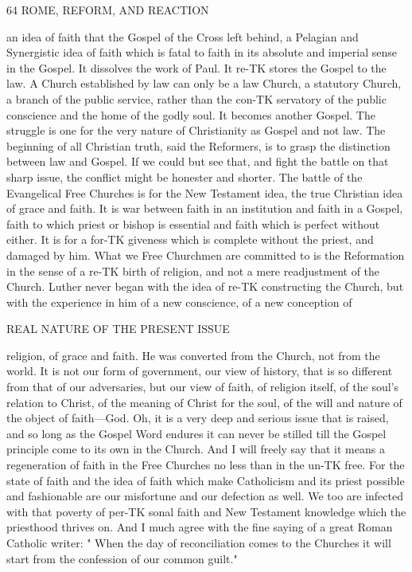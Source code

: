 \documentclass[12pt,a5paper,oneside]{book}
\begin{document}
64 ROME, REFORM, AND REACTION 

an idea of faith that the Gospel of the Cross left 
behind, a Pelagian and Synergistic idea of faith which 
is fatal to faith in its absolute and imperial sense in 
the Gospel. It dissolves the work of Paul. It re-TK
stores the Gospel to the law. A Church established 
by law can only be a law Church, a statutory Church, 
a branch of the public service, rather than the con-TK
servatory of the public conscience and the home of 
the godly soul. It becomes another Gospel. The 
struggle is one for the very nature of Christianity as 
Gospel and not law. The beginning of all Christian 
truth, said the Reformers, is to grasp the distinction 
between law and Gospel. If we could but see that, 
and fight the battle on that sharp issue, the conflict 
might be honester and shorter. The battle of the 
Evangelical Free Churches is for the New Testament 
idea, the true Christian idea of grace and faith. It is 
war between faith in an institution and faith in a 
Gospel, faith to which priest or bishop is essential and 
faith which is perfect without either. It is for a for-TK
giveness which is complete without the priest, and 
damaged by him. What we Free Churchmen are 
committed to is the Reformation in the sense of a re-TK
birth of religion, and not a mere readjustment of the 
Church. Luther never began with the idea of re-TK
constructing the Church, but with the experience in 
him of a new conscience, of a new conception of 



REAL NATURE OF THE PRESENT ISSUE  

religion, of grace and faith. He was converted from 
the Church, not from the world. It is not our form 
of government, our view of history, that is so different 
from that of our adversaries, but our view of faith, of 
religion itself, of the soul's relation to Christ, of the 
meaning of Christ for the soul, of the will and nature 
of the object of faith---God. Oh, it is a very deep 
and serious issue that is raised, and so long as the 
Gospel Word endures it can never be stilled till the 
Gospel principle come to its own in the Church. 
And I will freely say that it means a regeneration of 
faith in the Free Churches no less than in the un-TK
free. For the state of faith and the idea of faith 
which make Catholicism and its priest possible and 
fashionable are our misfortune and our defection as 
well. We too are infected with that poverty of per-TK
sonal faith and New Testament knowledge which the 
priesthood thrives on. And I much agree with the 
fine saying of a great Roman Catholic writer: 
" When the day of reconciliation comes to the 
Churches it will start from the confession of our 
common guilt." 
\end{document}
